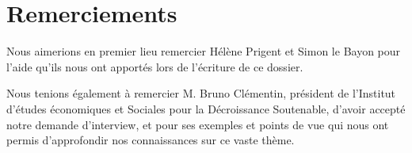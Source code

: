 \chapter*{Remerciements}


Nous aimerions en premier lieu remercier Hélène Prigent et Simon le Bayon pour l'aide qu'ils nous ont apportés lors de l'écriture de ce dossier.

\bigbreak Nous tenions également à remercier M. Bruno Clémentin, président de l'Institut d'études économiques et Sociales pour la Décroissance Soutenable, d'avoir accepté notre demande d'interview, et pour ses exemples et points de vue qui nous ont permis d'approfondir nos connaissances sur ce vaste thème.


